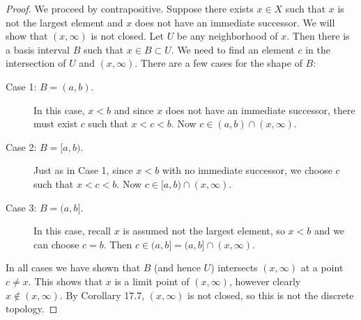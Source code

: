\documentclass[11pt]{article}
\begin{document}
\begin{proof}
  We proceed by contrapositive. Suppose there exists $x \in X$ such that $x$ is
  not the largest element and $x$ does not have an immediate successor. We will
  show that $(x, \infty)$ is not closed. Let $U$
  be any neighborhood of $x$. Then there is a basis interval $B$
  such that $x \in B \subset U$. We need to find an element $c$ in the
  intersection of $U$ and $(x, \infty)$. There are a few cases for the shape of $B$:
  \begin{description}
    \item[Case 1: $B = (a, b)$.]
      In this case, $x < b$ and since $x$ does not have an immediate successor,
      there must exist $c$ such that $x < c < b$. Now $c \in (a, b) \cap (x, \infty)$.
    \item[{Case 2: $B = [a, b)$.}]
      Just as in Case 1, since $x < b$ with no immediate successor, we choose
      $c$ such that $x < c < b$. Now $c \in [a, b) \cap (x, \infty)$.
    \item[{Case 3: $B = (a, b]$.}]
      In this case, recall $x$ is assumed not the largest element, so $x < b$ and
      we can choose $c = b$. Then $c \in (a, b] = (a, b] \cap (x, \infty).$
  \end{description}
  In all cases we have shown that $B$ (and hence $U$) intersects $(x, \infty)$ at a point $c
  \neq x$. This shows that $x$ is a limit point of $(x, \infty)$, however
  clearly $x \not\in (x, \infty)$. By Corollary 17.7, $(x, \infty)$ is not
  closed, so this is not the discrete topology.
\end{proof}
\end{document}
